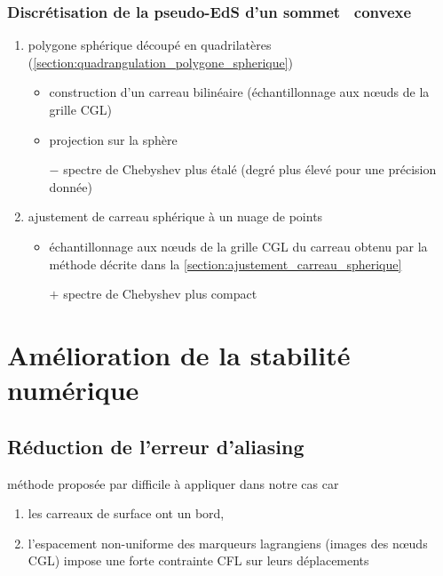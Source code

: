 \subsubsection{Discrétisation de la pseudo-EdS d'un sommet \brep\ convexe}
\begin{enumerate}
	\item polygone sphérique découpé en quadrilatères (\cf \autoref{section:quadrangulation_polygone_spherique})
	\begin{itemize}
		\item construction d'un carreau bilinéaire (échantillonnage aux n\oe uds de la grille CGL)
		\item projection sur la sphère
		\item[$-$] spectre de Chebyshev plus étalé (degré plus élevé pour une précision donnée)
	\end{itemize}
	\item ajustement de carreau sphérique à un nuage de points
	\begin{itemize}
		\item échantillonnage aux n\oe uds de la grille CGL du carreau obtenu par la méthode décrite dans la \autoref{section:ajustement_carreau_spherique}
		\item[$+$] spectre de Chebyshev plus compact
	\end{itemize}
\end{enumerate}




\section{Amélioration de la stabilité numérique}
\subsection{Réduction de l'erreur d'aliasing}
méthode proposée par \cite{rahimian2015} difficile à appliquer dans notre cas car 
\begin{enumerate}
	\item les carreaux de surface ont un bord, 
	\item l'espacement non-uniforme des marqueurs lagrangiens (images des n\oe uds CGL) impose une forte contrainte CFL sur leurs déplacements
\end{enumerate}

